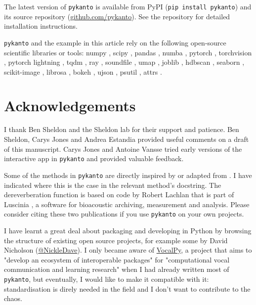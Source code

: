 The latest version of \texttt{pykanto} is available from PyPI (\texttt{pip install
pykanto}) and its source repository (\href{https://github.com/nilomr/pykanto}{github.com/pykanto}). See the repository for detailed installation instructions.

\texttt{pykanto} and the example in this article rely on the following open-source scientific
libraries or tools: numpy \parencite{numpy2020}, scipy \parencite{scipy2020}, pandas
\parencite{pandas2023}, numba \parencite{lam2015}, pytorch \parencite{pytorch2019},
torchvision \parencite{torchvision2016}, pytorch lightning
\parencite{pytorchlightning2019}, tqdm \parencite{tqdm2019}, ray \parencite{moritz2018},
soundfile \parencite{bechtold2022}, umap \parencite{mcinnes2018},  joblib
\parencite{joblib2020}, hdbscan \parencite{mcinnes2017}, seaborn \parencite{Waskom2021},
scikit-image \parencite{scikitimage2014}, librosa \parencite{mcfee2015}, bokeh
\parencite{bokeh2018}, ujson \parencite{ujason2023}, psutil \parencite{psutil2023}, attrs
\parencite{schlawack2019}.

\section{Acknowledgements}

I thank Ben Sheldon and the Sheldon lab for their support and
patience. Ben Sheldon, Carys Jones and Andrea Estandia provided useful comments on a draft of this
manuscript. Carys Jones and Antoine Vansse tried early versions of the
interactive app in \texttt{pykanto} and provided valuable feedback.

Some of the methods in \texttt{pykanto} are directly inspired by or adapted
from \cite{sainburg2020}. I have indicated where
this is the case in the relevant method's docstring. The dereverberation
function is based on code by Robert Lachlan that is part of Luscinia
\parencite{lachlan2016a}, a software for bioacoustic archiving, measurement and
analysis. Please consider citing these two publications if you use
\texttt{pykanto} on your own projects.

I have learnt a great deal about packaging and developing in Python by browsing
the structure of existing open source projects, for example some by David
Nicholson (\href{https://github.com/NickleDave/NickleDave}{@NickleDave}). I only
became aware of \href{https://github.com/vocalpy}{VocalPy}, a project that aims
to "develop an ecosystem of interoperable packages" for
"computational vocal communication and learning research" when I had
already written most of \texttt{pykanto}, but eventually, I would like to make it
compatible with it: standardisation is direly needed in the field and I don't
want to contribute to the chaos.

